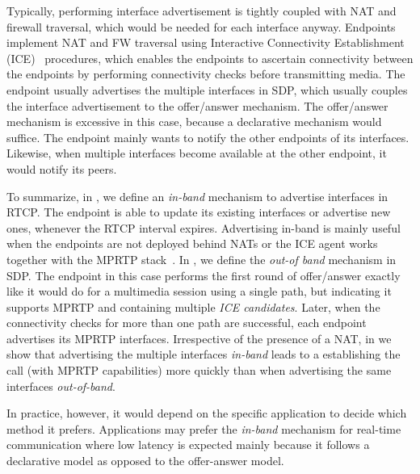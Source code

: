 
Typically, performing interface advertisement is tightly coupled with NAT and
firewall traversal, which would be needed for each interface anyway. Endpoints
implement NAT and FW traversal using Interactive Connectivity Establishment
(ICE)~\cite{rfc5245} procedures, which enables the endpoints to ascertain
connectivity between the endpoints by performing connectivity checks before
transmitting media. The endpoint usually advertises the multiple interfaces in
SDP, which usually couples the interface advertisement to the offer/answer
mechanism. The offer/answer mechanism is excessive in this case, because a
declarative mechanism would suffice. The endpoint mainly wants to notify the
other endpoints of its interfaces. Likewise, when multiple interfaces become
available at the other endpoint, it would notify its peers.

To summarize, in \cite{draft.mprtp}, we define an \emph{in-band} mechanism to
advertise interfaces in RTCP. The endpoint is able to update its existing
interfaces or advertise new ones, whenever the RTCP interval expires.
Advertising in-band is mainly useful when the endpoints are not deployed
behind NATs or the ICE agent works together with the MPRTP
stack~\cite{draft.mice}. In \cite{draft.mprtp.sdp}, we define the \emph{out-of
band} mechanism in SDP. The endpoint in this case performs the first round of
offer/answer exactly like it would do for a multimedia session using a single
path, but indicating it supports MPRTP and containing multiple \emph{ICE
candidates}. Later, when the connectivity checks for more than one path are
successful, each endpoint advertises its MPRTP interfaces. Irrespective of the
presence of a NAT, in  we show that advertising the multiple
interfaces \emph{in-band} leads to a establishing the call (with MPRTP
capabilities) more quickly than when advertising the same interfaces
\emph{out-of-band}.

In practice, however, it would depend on the specific application to decide
which method it prefers. Applications may prefer the \emph{in-band} mechanism
for real-time communication where low latency is expected mainly because it
follows a declarative model as opposed to the offer-answer model.



